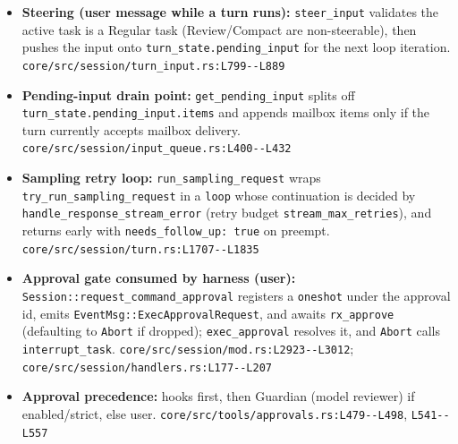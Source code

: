 \begin{itemize}
\item \textbf{Steering (user message while a turn runs):} \texttt{steer\_\allowbreak{}input} validates the active task is a Regular task (Review/Compact are non-steerable), then pushes the input onto \texttt{turn\_\allowbreak{}state.\allowbreak{}pending\_\allowbreak{}input} for the next loop iteration. \texttt{core/\allowbreak{}src/\allowbreak{}session/\allowbreak{}turn\_\allowbreak{}input.\allowbreak{}rs:\allowbreak{}L799-\allowbreak{}-\allowbreak{}L889}
\item \textbf{Pending-input drain point:} \texttt{get\_\allowbreak{}pending\_\allowbreak{}input} splits off \texttt{turn\_\allowbreak{}state.\allowbreak{}pending\_\allowbreak{}input.\allowbreak{}items} and appends mailbox items only if the turn currently accepts mailbox delivery. \texttt{core/\allowbreak{}src/\allowbreak{}session/\allowbreak{}input\_\allowbreak{}queue.\allowbreak{}rs:\allowbreak{}L400-\allowbreak{}-\allowbreak{}L432}
\item \textbf{Sampling retry loop:} \texttt{run\_\allowbreak{}sampling\_\allowbreak{}request} wraps \texttt{try\_\allowbreak{}run\_\allowbreak{}sampling\_\allowbreak{}request} in a \texttt{loop} whose continuation is decided by \texttt{handle\_\allowbreak{}response\_\allowbreak{}stream\_\allowbreak{}error} (retry budget \texttt{stream\_\allowbreak{}max\_\allowbreak{}retries}), and returns early with \texttt{needs\_\allowbreak{}follow\_\allowbreak{}up:\allowbreak{} true} on preempt. \texttt{core/\allowbreak{}src/\allowbreak{}session/\allowbreak{}turn.\allowbreak{}rs:\allowbreak{}L1707-\allowbreak{}-\allowbreak{}L1835}
\item \textbf{Approval gate consumed by harness (user):} \texttt{Session:\allowbreak{}:\allowbreak{}request\_\allowbreak{}command\_\allowbreak{}approval} registers a \texttt{oneshot} under the approval id, emits \texttt{EventMsg:\allowbreak{}:\allowbreak{}ExecApprovalRequest}, and awaits \texttt{rx\_\allowbreak{}approve} (defaulting to \texttt{Abort} if dropped); \texttt{exec\_\allowbreak{}approval} resolves it, and \texttt{Abort} calls \texttt{interrupt\_\allowbreak{}task}. \texttt{core/\allowbreak{}src/\allowbreak{}session/\allowbreak{}mod.\allowbreak{}rs:\allowbreak{}L2923-\allowbreak{}-\allowbreak{}L3012}; \texttt{core/\allowbreak{}src/\allowbreak{}session/\allowbreak{}handlers.\allowbreak{}rs:\allowbreak{}L177-\allowbreak{}-\allowbreak{}L207}
\item \textbf{Approval precedence:} hooks first, then Guardian (model reviewer) if enabled/strict, else user. \texttt{core/\allowbreak{}src/\allowbreak{}tools/\allowbreak{}approvals.\allowbreak{}rs:\allowbreak{}L479-\allowbreak{}-\allowbreak{}L498}, \texttt{L541-\allowbreak{}-\allowbreak{}L557}

\end{itemize}
